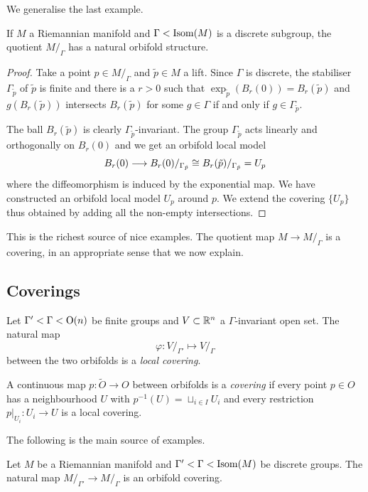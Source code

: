 We generalise the last example.

\begin{prop}
If $M$ a Riemannian manifold and $\Gamma<{\rm Isom}(M)$ is a discrete subgroup, the quotient $M/_\Gamma$ has a natural orbifold structure.
\end{prop}
\begin{proof}
Take a point $p\in M/_\Gamma$ and $\tilde p\in M$ a lift. Since $\Gamma$ is discrete, the stabiliser $\Gamma_{\tilde p}$ of $\tilde p$ is finite and there is a $r>0$ such that $\exp_{\tilde p}(B_r(0)) = B_r(\tilde p)$ and $g(B_r(\tilde p))$ intersects $B_r(\tilde p)$ for some $g\in \Gamma$ if and only if $g\in\Gamma_{\tilde p}$. 

The ball $B_r(\tilde p)$ is clearly $\Gamma_{\tilde p}$-invariant. The group $\Gamma_{\tilde p}$ acts linearly and orthogonally on $B_r(0)$ and we get an orbifold local model
$$B_r(0) \longrightarrow B_r(0) /_{\Gamma_{\tilde p}} \cong B_r(\tilde p)/_{\Gamma_{\tilde p}} = U_p$$
where the diffeomorphism is induced by the exponential map. We have constructed an orbifold local model $U_p$ around $p$. We extend the covering $\{U_p\}$ thus obtained by adding all the non-empty intersections. 
\end{proof}

This is the richest source of nice examples. The quotient map $M \to M/_\Gamma$ is a covering, in an appropriate sense that we now explain.

\subsection{Coverings}
Let $\Gamma' < \Gamma < {\rm O}(n)$ be finite groups and $V\subset \mathbb{R}^n$ a $\Gamma$-invariant open set. The natural map
$$\varphi\colon V/_{\Gamma'} \longmapsto V/_{\Gamma}$$
between the two orbifolds is a \emph{local covering}. 

\begin{defn}
A continuous map $p\colon \tilde O \to O$ between orbifolds is a \emph{covering} if every point $p\in O$ has a neighbourhood $U$ with $p^{-1}(U) = \sqcup_{i \in I} U_i$ and every restriction $p|_{U_i}\colon U_i \to U$ is a local covering.
\end{defn}

The following is the main source of examples.

\begin{example}
Let $M$ be a Riemannian manifold and $\Gamma' < \Gamma < {\rm Isom}(M)$ be discrete groups. The natural map $M/_{\Gamma'} \to M/_\Gamma$ is an orbifold covering.
\end{example}

